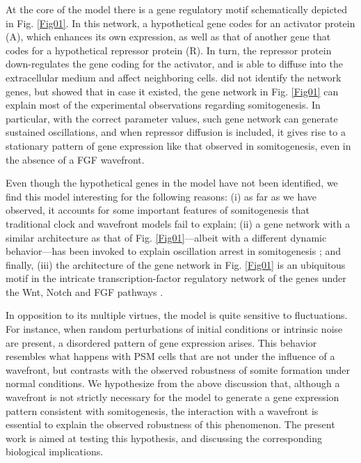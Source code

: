 \documentclass[11pt]{article}
\begin{document}
	At the core of the \citeauthor{Cotterell2015} model there is a gene regulatory
	motif schematically depicted in Fig. \ref{Fig01}. In this network, a
	hypothetical gene codes for an activator protein (A), which enhances its own
	expression, as well as that of another gene that codes for a hypothetical
	repressor protein (R). In turn, the repressor protein down-regulates the gene
	coding for the activator, and is able to diffuse into the extracellular medium
	and affect neighboring cells. \citeauthor{Cotterell2015} did not identify the
	network genes, but showed that in case it existed, the gene network in Fig.
	\ref{Fig01} can explain most of the experimental observations regarding
	somitogenesis. In particular, with the correct parameter values, such gene
	network can generate sustained oscillations, and when repressor diffusion is
	included, it gives rise to a stationary pattern of gene expression like that
	observed in somitogenesis, even in the absence of a FGF wavefront.
	
	Even though the hypothetical genes in the \citeauthor{Cotterell2015} model have
	not been identified, we find this model interesting for the following reasons:
	(i) as far as we have observed, it accounts for some important features of
	somitogenesis that traditional clock and wavefront models fail to explain; (ii)
	a gene network with a similar architecture as that of Fig. \ref{Fig01}---albeit
	with a different dynamic behavior---has been invoked to explain oscillation
	arrest in somitogenesis \citep{Santillan2008, Zavala2012}; and finally, (iii)
	the architecture of the gene network in Fig. \ref{Fig01} is an ubiquitous motif
	in the intricate transcription-factor regulatory network of the genes under the
	Wnt, Notch and FGF pathways \citep{Gibb2010, Zavala2012}.
	
	In opposition to its multiple virtues, the \citeauthor{Cotterell2015} model is
	quite sensitive to fluctuations. For instance, when random perturbations of
	initial conditions or intrinsic noise are present, a disordered pattern of gene
	expression arises. This behavior resembles what happens with PSM cells that are
	not under the influence of a wavefront, but contrasts with the observed
	robustness of somite formation under normal conditions. We hypothesize from the
	above discussion that, although a wavefront is not strictly necessary for the
	\citeauthor{Cotterell2015} model to generate a gene expression pattern
	consistent with somitogenesis, the interaction with a wavefront is essential to
	explain the observed robustness of this phenomenon. The present work is aimed at
	testing this hypothesis, and discussing the corresponding biological
	implications.
	
\end{document}

